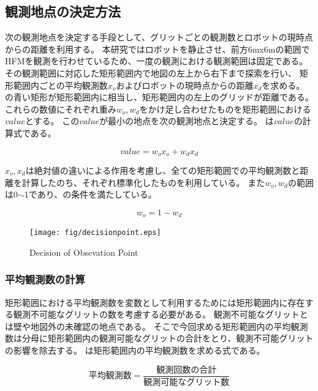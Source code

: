 \documentclass{jsarticle}
\begin{document}
\subsection{観測地点の決定方法}
\label{decide}
次の観測地点を決定する手段として、グリットごとの観測数とロボットの現時点からの距離を利用する。
本研究ではロボットを静止させ、前方6mx6mの範囲でHFMを観測を行わせているため、一度の観測における観測範囲は固定である。
その観測範囲に対応した矩形範囲内で地図の左上から右下まで探索を行い、
矩形範囲内ごとの平均観測数$x_{o}$およびロボットの現時点からの距離$x_{d}$を求める。
の青い矩形が矩形範囲内に相当し、矩形範囲内の左上のグリッドが距離である。
これらの数値にそれぞれ重み$w_{o},w_{d}$をかけ足し合わせたものを矩形範囲における$value$とする。
この$value$が最小の地点を次の観測地点と決定する。
は$value$の計算式である。

\begin{equation}
  value = w_{o}x_{o} + w_{d}x_{d}
	\label{eqn: value}
\end{equation}

$x_o,x_d$は絶対値の違いによる作用を考慮し、全ての矩形範囲での平均観測数と距離を計算したのち、それぞれ標準化したものを利用している。
また$w_o,w_d$の範囲は0$\sim$1であり、の条件を満たしている。

\begin{equation}
  w_o = 1 - w_d
	\label{eqn: weight}
\end{equation}


\begin{figure}[tbh]
 \centering
  \texttt{[image: fig/decisionpoint.eps]}
  \vspace*{-4mm}
  \caption{Decision of Obsevation Point}
  \label{fig: value-method}
\end{figure}

\subsubsection{平均観測数の計算}
矩形範囲における平均観測数を変数として利用するためには矩形範囲内に存在する観測不可能なグリットの数を考慮する必要がある。
観測不可能なグリットとは壁や地図外の未確認の地点である。
そこで今回求める矩形範囲内の平均観測数は分母に矩形範囲内の観測可能なグリットの合計をとり、観測不可能グリットの影響を除去する。
は矩形範囲内の平均観測数を求める式である。

\begin{equation}
  平均観測数 = \frac{観測回数の合計}{観測可能なグリット数}
	\label{eqn: observation}
\end{equation}
\end{document}
